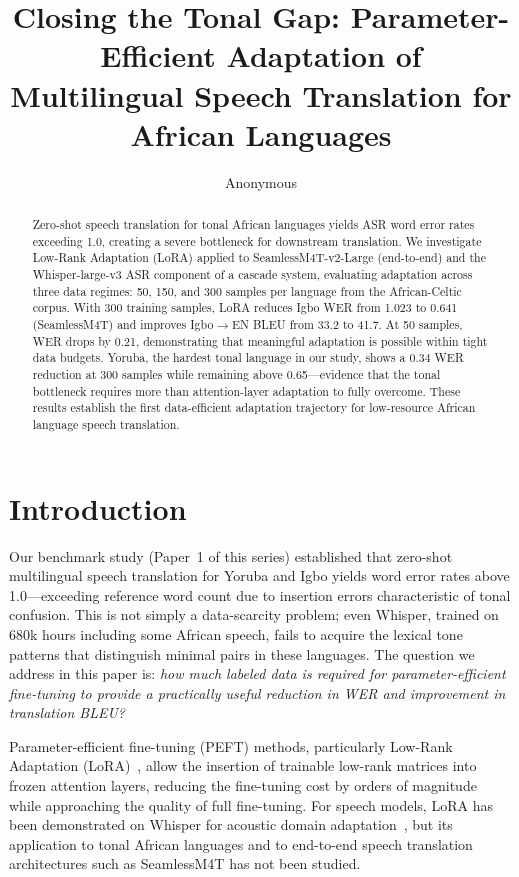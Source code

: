 \documentclass[11pt,a4paper]{article}
\title{Closing the Tonal Gap: Parameter-Efficient Adaptation of\\
Multilingual Speech Translation for African Languages}
\author{Anonymous}
\date{}
\newcommand{\modelSM}{SeamlessM4T-v2-Large}
\newcommand{\dataAC}{African-Celtic}
\begin{document}
\maketitle

\begin{abstract}
Zero-shot speech translation for tonal African languages yields ASR word error rates exceeding 1.0, creating a severe bottleneck for downstream translation. We investigate Low-Rank Adaptation (LoRA) applied to \modelSM{} (end-to-end) and the Whisper-large-v3 ASR component of a cascade system, evaluating adaptation across three data regimes: 50, 150, and 300 samples per language from the \dataAC{} corpus. With 300 training samples, LoRA reduces Igbo WER from 1.023 to 0.641 (SeamlessM4T) and improves Igbo$\to$EN BLEU from 33.2 to 41.7. At 50 samples, WER drops by 0.21, demonstrating that meaningful adaptation is possible within tight data budgets. Yoruba, the hardest tonal language in our study, shows a 0.34 WER reduction at 300 samples while remaining above 0.65—evidence that the tonal bottleneck requires more than attention-layer adaptation to fully overcome. These results establish the first data-efficient adaptation trajectory for low-resource African language speech translation.
\end{abstract}

\section{Introduction}
\label{sec:intro}

Our benchmark study (Paper~1 of this series) established that zero-shot multilingual speech translation for Yoruba and Igbo yields word error rates above 1.0—exceeding reference word count due to insertion errors characteristic of tonal confusion. This is not simply a data-scarcity problem; even Whisper, trained on 680k hours including some African speech, fails to acquire the lexical tone patterns that distinguish minimal pairs in these languages. The question we address in this paper is: \emph{how much labeled data is required for parameter-efficient fine-tuning to provide a practically useful reduction in WER and improvement in translation BLEU?}

Parameter-efficient fine-tuning (PEFT) methods, particularly Low-Rank Adaptation (LoRA)~\citep{hu2022lora}, allow the insertion of trainable low-rank matrices into frozen attention layers, reducing the fine-tuning cost by orders of magnitude while approaching the quality of full fine-tuning. For speech models, LoRA has been demonstrated on Whisper for acoustic domain adaptation~\citep{majumdar2023lora}, but its application to tonal African languages and to end-to-end speech translation architectures such as SeamlessM4T has not been studied.
\end{document}

